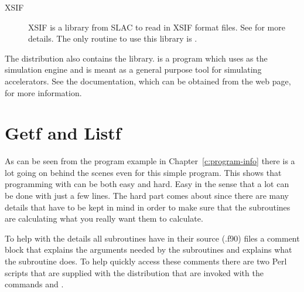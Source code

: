 \begin{description}
\item[XSIF] 
XSIF is a library from SLAC to read in XSIF format files. See 
 for more details. The only
\bmad routine to use this library is .

\end{description}

The \bmad distribution also contains the \tao library. \tao is a program 
which uses \bmad as the simulation engine and is meant as a general 
purpose tool for simulating accelerators. See the \tao documentation, which 
can be obtained from the \bmad web page, for more information.

\section{Getf and Listf}
\label{s:getf}

As can be seen from the program example in Chapter~\ref{c:program-info}
there is a lot going on behind the scenes even for this
simple program. This shows that programming with \bmad can be both easy
and hard. Easy in the sense that a lot can be done with just a few
lines. The hard part comes about since there are many details that
have to be kept in mind in order to make sure that the subroutines
are calculating what you really want them to calculate.

To help with the details all \bmad subroutines have in their source (.f90)
files a comment block that explains the arguments needed by the
subroutines and explains what the subroutine does. To help quickly
access these comments there are two Perl scripts that are supplied
with the \bmad distribution that are invoked with the commands
 and .

